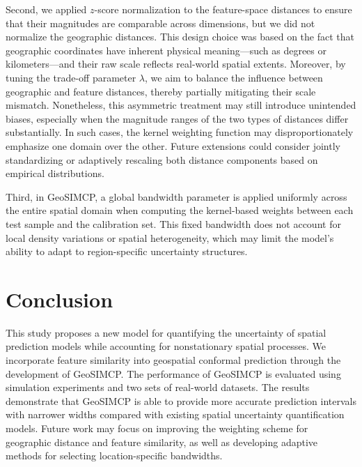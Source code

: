 \documentclass[authoryear,preprint,review,12pt]{elsarticle}
\begin{document}
Second, we applied $z$-score normalization to the feature-space distances to ensure that their magnitudes are comparable across dimensions, but we did not normalize the geographic distances. This design choice was based on the fact that geographic coordinates have inherent physical meaning—such as degrees or kilometers—and their raw scale reflects real-world spatial extents. Moreover, by tuning the trade-off parameter $\lambda$, we aim to balance the influence between geographic and feature distances, thereby partially mitigating their scale mismatch. Nonetheless, this asymmetric treatment may still introduce unintended biases, especially when the magnitude ranges of the two types of distances differ substantially. In such cases, the kernel weighting function may disproportionately emphasize one domain over the other. Future extensions could consider jointly standardizing or adaptively rescaling both distance components based on empirical distributions.

Third, in GeoSIMCP, a global bandwidth parameter is applied uniformly across the entire spatial domain when computing the kernel-based weights between each test sample and the calibration set. This fixed bandwidth does not account for local density variations or spatial heterogeneity, which may limit the model’s ability to adapt to region-specific uncertainty structures.






\section{Conclusion}

This study proposes a new model for quantifying the uncertainty of spatial prediction models while accounting for nonstationary spatial processes. We incorporate feature similarity into geospatial conformal prediction through the development of GeoSIMCP. The performance of GeoSIMCP is evaluated using simulation experiments and two sets of real-world datasets. The results demonstrate that GeoSIMCP is able to provide more accurate prediction intervals with narrower widths compared with existing spatial uncertainty quantification models. Future work may focus on improving the weighting scheme for geographic distance and feature similarity, as well as developing adaptive methods for selecting location-specific bandwidths.

\end{document}
